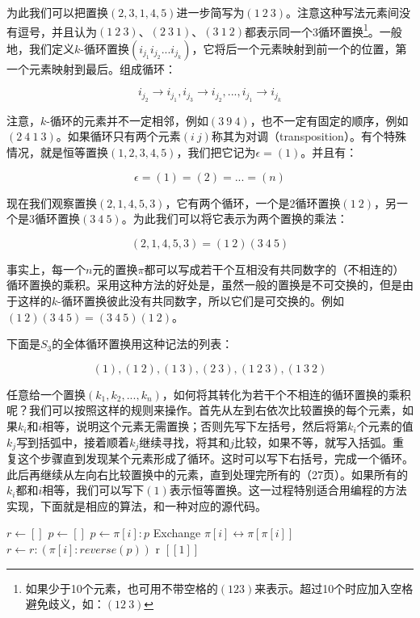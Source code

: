 \documentclass[b5paper]{ctexart}
\begin{document}
为此我们可以把置换$(2, 3, 1, 4, 5)$进一步简写为$(1\ 2\ 3)$。注意这种写法元素间没有逗号，并且认为$(1\ 2\ 3)$、$(2\ 3\ 1)$、$(3\ 1\ 2)$都表示同一个3循环置换\footnote{如果少于10个元素，也可用不带空格的$(123)$来表示。超过10个时应加入空格避免歧义，如：$(12\ 3)$}。一般地，我们定义$k$-循环置换$(i_{j_1} i_{j_2} ... i_{j_k})$，它将后一个元素映射到前一个的位置，第一个元素映射到最后。组成循环：

\[
i_{j_2} \to i_{j_1}, i_{j_3} \to i_{j_2}, ..., i_{j_1} \to i_{j_k}
\]

注意，$k$-循环的元素并不一定相邻，例如$(3\ 9\ 4)$，也不一定有固定的顺序，例如$(2\ 4\ 1\ 3)$。如果循环只有两个元素$(i\ j)$称其为对调（transposition）。有个特殊情况，就是恒等置换$(1, 2, 3, 4, 5)$，我们把它记为$\epsilon = (1)$。并且有：

\[
\epsilon = (1) = (2) = ... = (n)
\]

现在我们观察置换$(2, 1, 4, 5, 3)$，它有两个循环，一个是2循环置换$(1\ 2)$，另一个是3循环置换$(3\ 4\ 5)$。为此我们可以将它表示为两个置换的乘法：

\[
(2, 1, 4, 5, 3) = (1\ 2)(3\ 4\ 5)
\]

事实上，每一个$n$元的置换$\pi$都可以写成若干个互相没有共同数字的（不相连的）循环置换的乘积。采用这种方法的好处是，虽然一般的置换是不可交换的，但是由于这样的$k$-循环置换彼此没有共同数字，所以它们是可交换的。例如$(1\ 2)(3\ 4\ 5) = (3\ 4\ 5)(1\ 2)$。

下面是$S_3$的全体循环置换用这种记法的列表：

\[
(1),
(1\ 2), (1\ 3), (2\ 3),
(1\ 2\ 3), (1\ 3\ 2)
\]

任意给一个置换$(k_1, k_2, ..., k_n)$，如何将其转化为若干个不相连的循环置换的乘积呢？我们可以按照这样的规则来操作。首先从左到右依次比较置换的每个元素，如果$k_i$和$i$相等，说明这个元素无需置换；否则先写下左括号，然后将第$k_i$个元素的值$k_j$写到括弧中，接着顺着$k_j$继续寻找，将其和$j$比较，如果不等，就写入括弧。重复这个步骤直到发现某个元素形成了循环。这时可以写下右括号，完成一个循环。此后再继续从左向右比较置换中的元素，直到处理完所有的\cite{Armstrong1988}（27页）。如果所有的$k_i$都和$i$相等，我们可以写下$(1)$表示恒等置换。这一过程特别适合用编程的方法实现，下面就是相应的算法，和一种对应的源代码。

\begin{algorithmic}
  \State $r \gets []$
    \State $p \gets []$
      \State $p \gets \pi[i]:p$
      \State Exchange $\pi[i] \leftrightarrow \pi[\pi[i]]$
    \EndWhile
      \State $r \gets r:(\pi[i]:reverse(p))$
    \EndIf
  \EndFor
    \State \Return r
  \Else
    \State \Return $[[1]]$ 
  \EndIf
\EndFunction
\end{algorithmic}
\end{document}

